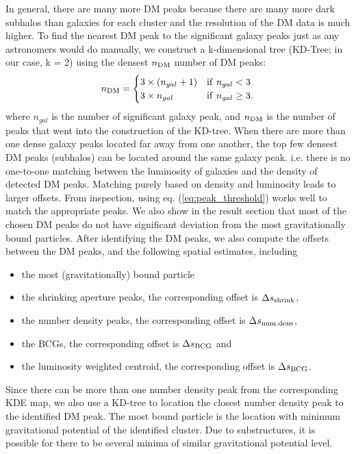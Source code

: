 In general, there are many more DM peaks because there are many more dark 
subhalos than galaxies for each cluster and the resolution of the DM data is
much higher. To find the nearest DM peak to the significant galaxy peaks just as any
astronomers would do manually,  
we construct a k-dimensional tree (KD-Tree; in our case, k = 2) 
using the densest $n_{\rm DM}$  number of DM peaks:
\begin{equation}
	n_{\rm DM} = \begin{cases}		
		3 \times (n_{gal} + 1) & {\rm if~} n_{gal} < 3 \\
	3 \times n_{gal}  & {\rm if~} n_{gal} \geq 3.
	\end{cases}
	\label{eq:peak_threshold}
\end{equation}
where $n_{gal}$ is the number of significant galaxy peak, and $n_{\rm DM}$
is the number of peaks that went into the construction of the KD-tree.
When there are more
than one dense galaxy peaks located far away from one another, 
the top few densest DM peaks (subhalos) 
can be located around the same galaxy peak.
i.e. there is no one-to-one matching between the luminosity of galaxies and the
density of detected DM peaks.
Matching purely based on density and luminosity leads to larger offsets.
From inspection, using eq. (\ref{eq:peak_threshold}) works well to match the 
appropriate peaks. We also show in the result section that most of the chosen DM peaks
do not have significant deviation from the most gravitationally bound particles.
After identifying the DM peaks, we also compute the 
offsets 
between the DM peaks, and the following spatial estimates, including 
\begin{itemize}
	\item the most (gravitationally) bound particle 
	\item the shrinking aperture peaks, the corresponding offset is $\Delta s_{\rm
		shrink}$, 
	\item the number density peaks, the corresponding offset is $\Delta s_{\rm
		num.dens}$, 
	\item the BCGs, the corresponding offset is $\Delta s_{\rm BCG}$ and
\item the luminosity weighted centroid, the corresponding offset is $\Delta s_{\rm BCG}$.
\end{itemize}
Since there can be more than one number density peak from the corresponding KDE
map, we also use a KD-tree to location the closest number density peak to the 
identified DM peak.
The most bound particle is the location with minimum 
gravitational potential of the {} identified cluster.
Due to substructures, it is possible for there to be several minima of similar 
gravitational potential level. 

